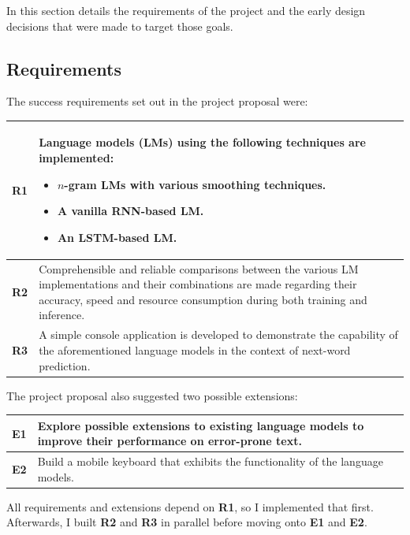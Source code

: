 \documentclass[a4paper, 12pt]{report}
\newcommand{\tbf}[1]{\textbf{#1}}
\begin{document}
In this section details the requirements of the project and the early design decisions that were made to target those goals.

\subsection{Requirements}

The success requirements set out in the project proposal were:

\begin{center}
\begin{tabular}{L{1cm} L{14cm}}
	\hline
	\tbf{R1} & Language models (LMs) using the following techniques are implemented:
	\begin{itemize}[nosep]
	\item
		$n$-gram LMs with various smoothing techniques.
	\item
		A vanilla RNN-based LM.
	\item
		An LSTM-based LM.
	\end{itemize}\\[-\normalbaselineskip] \hline
	\tbf{R2} & Comprehensible and reliable comparisons between the various LM implementations and their combinations are made regarding their accuracy, speed and resource consumption during both training and inference. \\ \hline
	\tbf{R3} & A simple console application is developed to demonstrate the capability of the aforementioned language models in the context of next-word prediction. \\ \hline
\end{tabular}
\end{center}

The project proposal also suggested two possible extensions:
\begin{center}
\begin{tabular}{L{1cm} L{14cm}}
	\hline
	\tbf{E1} & Explore possible extensions to existing language models to improve their performance on error-prone text. \\ \hline
	\tbf{E2} & Build a mobile keyboard that exhibits the functionality of the language models. \\ \hline
\end{tabular}
\end{center}

All requirements and extensions depend on \tbf{R1}, so I implemented that first. Afterwards, I built \tbf{R2} and \tbf{R3} in parallel before moving onto \tbf{E1} and \tbf{E2}.
\end{document}
